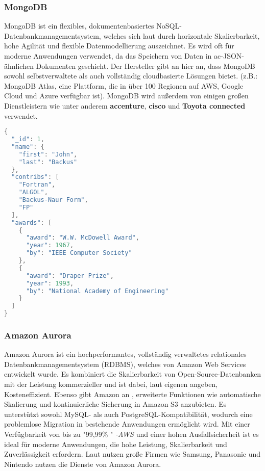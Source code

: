 \subsubsection{MongoDB}
MongoDB ist ein flexibles, dokumentenbasiertes NoSQL-Datenbankmanagementsystem, welches sich laut \cite{MongoDB:Introduction} durch horizontale Skalierbarkeit, hohe Agilität und flexible Datenmodellierung auszeichnet. Es wird oft für moderne Anwendungen verwendet, da das Speichern von Daten in \gls{ac-JSON}-ähnlichen Dokumenten geschieht. Der Hersteller gibt an hier \cite{MongoDB:Databases} an, dass MongoDB sowohl selbstverwaltete als auch vollständig cloudbasierte Lösungen bietet. (z.B.: MongoDB Atlas, eine Plattform, die in über 100 Regionen auf AWS, Google Cloud und Azure verfügbar ist). MongoDB wird außerdem von einigen großen Dienstleistern wie unter anderem \textbf{accenture}, \textbf{cisco} und \textbf{Toyota connected} verwendet. \cite{MongoDB:MainPage}\newline 


\begin{lstlisting}[language=Java, caption={Beispiel für ein JSON-Objekt, welches in einer MongoDB Datenbank gespeichert sein könnte \cite{MongoDB:JSON}}]
{
  "_id": 1,
  "name": {
    "first": "John",
    "last": "Backus"
  },
  "contribs": [
    "Fortran",
    "ALGOL",
    "Backus-Naur Form",
    "FP"
  ],
  "awards": [
    {
      "award": "W.W. McDowell Award",
      "year": 1967,
      "by": "IEEE Computer Society"
    },
    {
      "award": "Draper Prize",
      "year": 1993,
      "by": "National Academy of Engineering"
    }
  ]
}    
\end{lstlisting}



\subsubsection{Amazon Aurora}
Amazon Aurora ist ein hochperformantes, vollständig verwaltetes relationales Datenbankmanagementsystem (RDBMS), welches von \gls{Amazon Web Services} entwickelt wurde. Es kombiniert die Skalierbarkeit von Open-Source-Datenbanken mit der Leistung kommerzieller und ist dabei, laut eigenen angeben, Kosteneffizient. Ebenso gibt Amazon an \cite{Amazon:S3}, erweiterte Funktionen wie automatische Skalierung und kontinuierliche Sicherung in \gls{Amazon S3} anzubieten. Es unterstützt sowohl MySQL- als auch PostgreSQL-Kompatibilität, wodurch eine problemlose Migration in bestehende Anwendungen ermöglicht wird. Mit einer Verfügbarkeit von bis zu "99,99\% " \textit{-AWS \cite{Amazon:aurora}} und einer hohen Ausfallsicherheit ist es ideal für moderne Anwendungen, die hohe Leistung, Skalierbarkeit und Zuverlässigkeit erfordern. Laut \cite{Amazon:aurora} nutzen große Firmen wie Samsung, Panasonic und Nintendo nutzen die Dienste von Amazon Aurora. 

